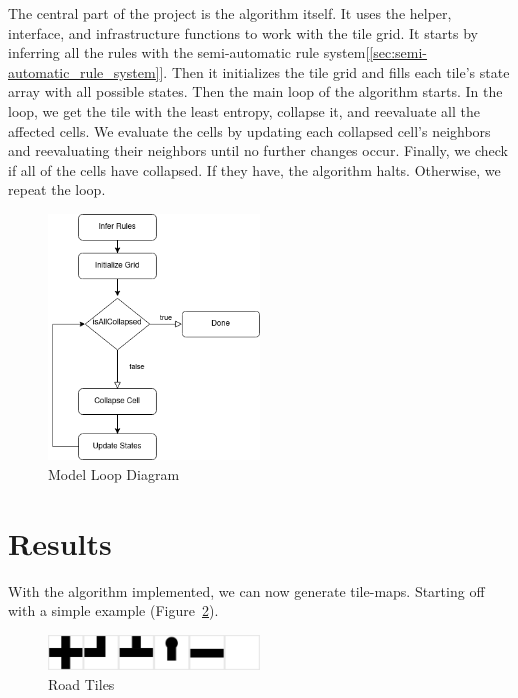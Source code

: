 \documentclass[10pt,oneside,a4paper]{article}
\begin{document}
The central part of the project is the algorithm itself.
It uses the helper, interface, and infrastructure functions to work with the tile grid.
It starts by inferring all the rules with the semi-automatic rule system[\ref*{sec:semi-automatic_rule_system}].
Then it initializes the tile grid and fills each tile's state array with all possible states.
Then the main loop of the algorithm starts.
In the loop, we get the tile with the least entropy, collapse it, and reevaluate all the affected cells.
We evaluate the cells by updating each collapsed cell's neighbors and reevaluating their neighbors until no further changes occur.
Finally, we check if all of the cells have collapsed. If they have, the algorithm halts.
Otherwise, we repeat the loop.
\newline
\begin{figure}[ht]
    \centering
    \includegraphics[width=0.5\textwidth]{figures/model_loop_diagram.png}
    \caption{Model Loop Diagram}\label{fig:model_loop_diagram}
\end{figure}

\section{Results}\label{sec:results}
With the algorithm implemented, we can now generate tile-maps.
Starting off with a simple example (Figure~\ref{fig:example1}).
\begin{figure}[ht]
    \centering
    \includegraphics[width=0.5\textwidth]{figures/road_tiles.png}
    \caption{Road Tiles}\label{fig:example1}
\end{figure}
\end{document}
